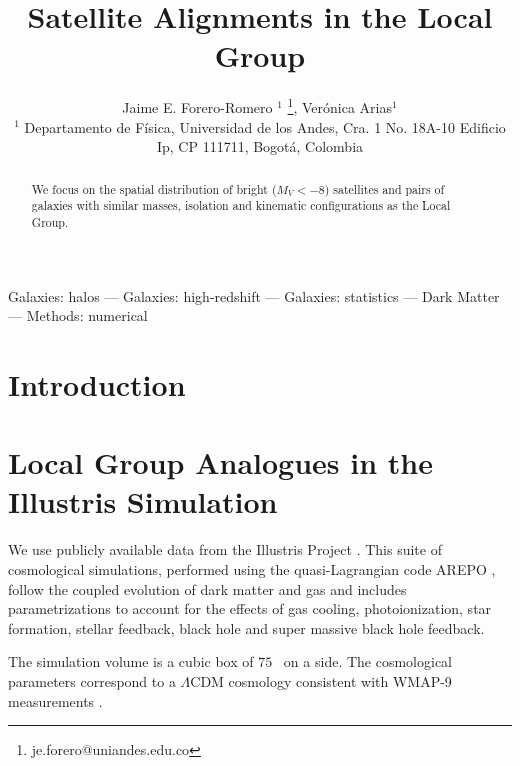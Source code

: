 \documentclass[useAMS,usenatbib,usegraphicx]{mn2e}
\newcommand{\hMpc}{{\ifmmode{h^{-1}{\rm Mpc}}\else{$h^{-1}$Mpc}\fi}}
\begin{document}
\title[LG satellite alignments]{Satellite Alignments in the Local Group}
\author[J.E. Forero-Romero \& V. Arias]
{Jaime E. Forero-Romero $^{1}$ \thanks{je.forero@uniandes.edu.co},
Ver\'onica Arias$^1$\\
$^1$ Departamento de F\'isica, Universidad de los Andes, Cra. 1
  No. 18A-10 Edificio Ip, CP 111711, Bogot\'a, Colombia \\
}

\maketitle

\begin{abstract}
We focus on the spatial distribution of bright ($M_V<-8$) satellites and
pairs of galaxies with similar masses, isolation and kinematic
configurations as the Local Group. 
\end{abstract}

\begin{keywords}Galaxies: halos --- Galaxies: high-redshift --- Galaxies: statistics
--- Dark Matter --- Methods: numerical 
\end{keywords}

\section{Introduction}

\section{Local Group Analogues in the Illustris Simulation}
\label{sec:NumericalSetup}

We use publicly available data from the Illustris Project 
\citep{2014MNRAS.444.1518V}. 
This suite of cosmological simulations, performed using the quasi-Lagrangian
code AREPO \citep{2010MNRAS.401..791S}, follow the coupled evolution of dark 
matter and gas and includes parametrizations to account for the effects of
gas cooling, photoionization, star formation, stellar feedback, black
hole and super massive black hole feedback. 

The simulation volume is a cubic box of $75$ \hMpc\ on a side.
The cosmological parameters correspond to a $\Lambda$CDM cosmology
consistent with WMAP-9 measurements \citep{2013ApJS..208...19H}. 
\end{document}
